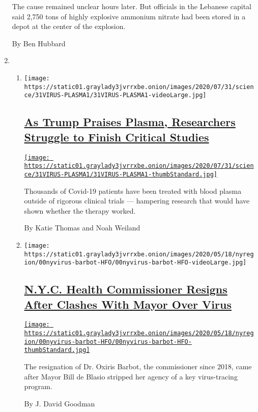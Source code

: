 \begin{enumerate}
  The cause remained unclear hours later. But officials in the Lebanese
  capital said 2,750 tons of highly explosive ammonium nitrate had been
  stored in a depot at the center of the explosion.

  By Ben Hubbard
\item
  \begin{enumerate}
  \def\labelenumii{\arabic{enumii}.}
  \item
    \texttt{[image: https://static01.graylady3jvrrxbe.onion/images/2020/07/31/science/31VIRUS-PLASMA1/31VIRUS-PLASMA1-videoLarge.jpg]}

    \hypertarget{as-trump-praises-plasma-researchers-struggle-to-finish-critical-studies}{%
    \subsection{\texorpdfstring{\href{/2020/08/04/health/trump-plasma.html}{As
    Trump Praises Plasma, Researchers Struggle to Finish Critical
    Studies}}{As Trump Praises Plasma, Researchers Struggle to Finish Critical Studies}}\label{as-trump-praises-plasma-researchers-struggle-to-finish-critical-studies}}

    \href{/2020/08/04/health/trump-plasma.html}{\texttt{[image: https://static01.graylady3jvrrxbe.onion/images/2020/07/31/science/31VIRUS-PLASMA1/31VIRUS-PLASMA1-thumbStandard.jpg]}}

    Thousands of Covid-19 patients have been treated with blood plasma
    outside of rigorous clinical trials --- hampering research that
    would have shown whether the therapy worked.

    By Katie Thomas and Noah Weiland
  \item
    \texttt{[image: https://static01.graylady3jvrrxbe.onion/images/2020/05/18/nyregion/00nyvirus-barbot-HFO/00nyvirus-barbot-HFO-videoLarge.jpg]}

    \hypertarget{nyc-health-commissioner-resigns-after-clashes-with-mayor-over-virus}{%
    \subsection{\texorpdfstring{\href{/2020/08/04/nyregion/oxiris-barbot-health-commissioner-resigns.html}{N.Y.C.
    Health Commissioner Resigns After Clashes With Mayor Over
    Virus}}{N.Y.C. Health Commissioner Resigns After Clashes With Mayor Over Virus}}\label{nyc-health-commissioner-resigns-after-clashes-with-mayor-over-virus}}

    \href{/2020/08/04/nyregion/oxiris-barbot-health-commissioner-resigns.html}{\texttt{[image: https://static01.graylady3jvrrxbe.onion/images/2020/05/18/nyregion/00nyvirus-barbot-HFO/00nyvirus-barbot-HFO-thumbStandard.jpg]}}

    The resignation of Dr. Oxiris Barbot, the commissioner since 2018,
    came after Mayor Bill de Blasio stripped her agency of a key
    virus-tracing program.

    By J. David Goodman
  \end{enumerate}
\end{enumerate}

